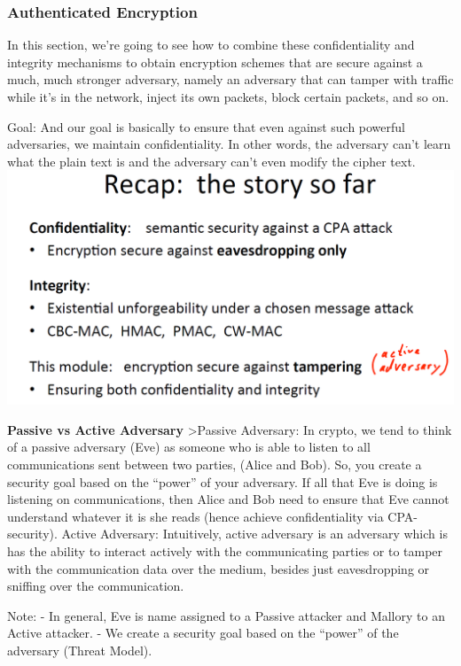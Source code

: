 \documentclass[11pt]{article}
\makeatletter
\def\maxwidth{\ifdim\Gin@nat@width>\linewidth\linewidth
    \else\Gin@nat@width\fi}
\let\Oldincludegraphics\includegraphics
\renewcommand{\includegraphics}[1]{\Oldincludegraphics[width=.8\maxwidth]{#1}}
\makeatother
\begin{document}
    \hypertarget{authenticated-encryption}{%
\subsubsection{Authenticated
Encryption}\label{authenticated-encryption}}

In this section, we're going to see how to combine these confidentiality
and integrity mechanisms to obtain encryption schemes that are secure
against a much, much stronger adversary, namely an adversary that can
tamper with traffic while it's in the network, inject its own packets,
block certain packets, and so on.

Goal: And our goal is basically to ensure that even against such
powerful adversaries, we maintain confidentiality. In other words, the
adversary can't learn what the plain text is and the adversary can't
even modify the cipher text.
\includegraphics{./Images/AuthEncryp-Recap.png}

\textbf{Passive vs Active Adversary} \textgreater{}Passive Adversary: In
crypto, we tend to think of a passive adversary (Eve) as someone who is
able to listen to all communications sent between two parties, (Alice
and Bob). So, you create a security goal based on the ``power'' of your
adversary. If all that Eve is doing is listening on communications, then
Alice and Bob need to ensure that Eve cannot understand whatever it is
she reads (hence achieve confidentiality via CPA-security). Active
Adversary: Intuitively, active adversary is an adversary which is has
the ability to interact actively with the communicating parties or to
tamper with the communication data over the medium, besides just
eavesdropping or sniffing over the communication.

Note: - In general, Eve is name assigned to a Passive attacker and
Mallory to an Active attacker. - We create a security goal based on the
``power'' of the adversary (Threat Model).
\end{document}

